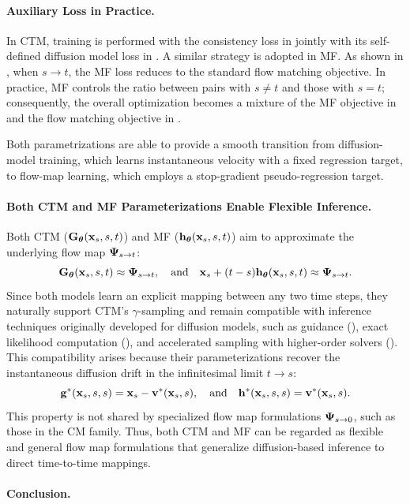 \paragraph{Auxiliary Loss in Practice.}
In CTM, training is performed with the consistency loss in  jointly with its self-defined diffusion model loss in . A similar strategy is adopted in MF. As shown in , when $s \to t$, the MF loss reduces to the standard flow matching objective. In practice, MF controls the ratio between pairs with $s \neq t$ and those with $s = t$; consequently, the overall optimization becomes a mixture of the MF objective in  and the flow matching objective in . 

Both parametrizations are able to provide a smooth transition from diffusion-model training, which learns instantaneous velocity with a fixed regression target, to flow-map learning, which employs a stop-gradient pseudo-regression target.


\paragraph{Both CTM and MF Parameterizations Enable Flexible Inference.}
Both CTM (${\mathbf{G}}_{\bm{\theta}}({\mathbf{x}}_s,s,t)$) and MF (${\mathbf{h}}_{\bm{\theta}}({\mathbf{x}}_s,s,t)$) aim to approximate the underlying flow map ${\bm{\Psi}}_{s\to t}$:
\[
{\mathbf{G}}_{\bm{\theta}}({\mathbf{x}}_s,s,t)\approx{\bm{\Psi}}_{s\to t},\quad  \text{and}
\quad 
{\mathbf{x}}_s+(t-s){\mathbf{h}}_{\bm{\theta}}({\mathbf{x}}_s,s,t)\approx{\bm{\Psi}}_{s\to t}.
\]
Since both models learn an explicit mapping between any two time steps, they naturally support CTM’s $\gamma$-sampling and remain compatible with inference techniques originally developed for diffusion models, such as guidance (), exact likelihood computation (), and accelerated sampling with higher-order solvers (). 
This compatibility arises because their parameterizations recover the instantaneous diffusion drift in the infinitesimal limit $t\to s$:
\[
{\mathbf{g}}^*({\mathbf{x}}_s,s,s)={\mathbf{x}}_s-{\mathbf{v}}^*({\mathbf{x}}_s,s),
\quad  \text{and}
\quad 
{\mathbf{h}}^*({\mathbf{x}}_s,s,s)={\mathbf{v}}^*({\mathbf{x}}_s,s).
\]
This property is not shared by specialized flow map formulations ${\bm{\Psi}}_{s\to0}$, such as those in the CM family. Thus, both CTM and MF can be regarded as flexible and general flow map formulations that generalize diffusion-based inference to direct time-to-time mappings.




\paragraph{Conclusion.}


